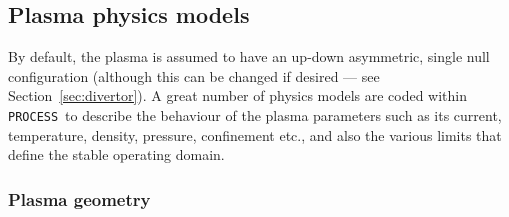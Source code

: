 \documentclass[11pt,a4paper]{report}
\newcommand{\process}{\mbox{\texttt{PROCESS}}}
\begin{document}
\subsection{Plasma physics models}
\label{sec:plasma_physics_models}

By default, the plasma is assumed to have an up-down asymmetric, single null
configuration (although this can be changed if desired --- see
Section~\ref{sec:divertor}). A great number of physics models are coded within
\process\ to describe the behaviour of the plasma parameters such as its
current, temperature, density, pressure, confinement etc., and also the
various limits that define the stable operating domain.

\subsubsection{Plasma geometry}
\label{sec:plasma_geometry}
\end{document}
